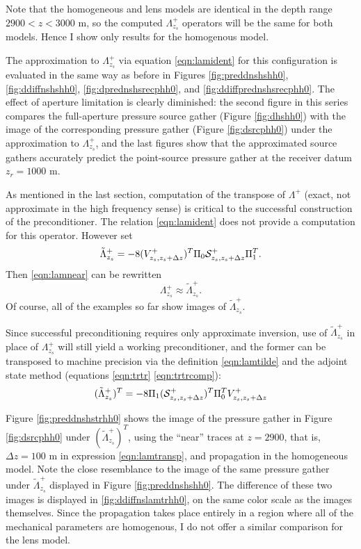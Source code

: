 Note that the homogeneous and lens models are identical in the depth
range $2900 < z < 3000$ m, so the computed $\Lambda^+_{z_s}$ operators
will be the same for both models. Hence I show only results for the
homogenous model.

The approximation to $\Lambda_{z_s}^+$ via equation \ref{eqn:lamident}
for this configuration is evaluated in the same way as before in
Figures \ref{fig:preddnshshh0}, \ref{fig:ddiffnshshh0},
\ref{fig:dprednshsrecphh0}, and \ref{fig:ddiffprednshsrecphh0}. The effect of aperture
limitation is clearly diminished: the second figure in this series
compares the full-aperture pressure source gather (Figure
\ref{fig:dhshh0}) with the 
image of the corresponding pressure gather (Figure \ref{fig:dsrcphh0})
under the approximation to $\Lambda_{z_s}^+$, and the last figures
show that the approximated source gathers accurately predict the
point-source pressure gather at the receiver datum $z_r=1000$ m.

As mentioned in the last section, computation of the transpose of
$\Lambda^+$ (exact, not approximate in the high frequency sense) is
critical to the successful construction of the preconditioner. The
relation \ref{eqn:lamident} does not provide a computation for this
operator. However set
\begin{equation}
  \label{eqn:lamtilde}
  \tilde{\Lambda}^+_{z_s} = -8(V^{+}_{z_s,z_s+\Delta z})^T\Pi_0 {\cal
    S}^+_{z_s,z_s+\Delta z}\Pi_1^T.
\end{equation}
Then \ref{eqn:lamnear} can be rewritten
\[
  \Lambda^+_{z_s} \approx \tilde{\Lambda}^+_{z_s}.
\]
Of course, all of the examples so far show images of
$\tilde{\Lambda}^+_{z_s}$.

Since successful preconditioning requires only approximate inversion,
use of $\tilde{\Lambda}^+_{z_s} $ in place of $\Lambda^+_{z_s}$ will
still yield a working preconditioner, and the former can be transposed
to machine precision via the definition \ref{eqn:lamtilde} and the adjoint state
method (equations \ref{eqn:trtr} \ref{eqn:trtrcomp}):
\begin{equation}
  \label{eqn:lamtransp}
  (\tilde{\Lambda}^+_{z_s})^T = -8 \Pi_1 ({\cal S}^+_{z_s,z_s+\Delta
    z})^T\Pi_0^T V^{+}_{z_s,z_s+\Delta z}
\end{equation}

Figure \ref{fig:preddnshstrhh0} shows the image of the pressure gather
in Figure \ref{fig:dsrcphh0} under $(\tilde{\Lambda}^+_{z_s})^T$,
using the ``near'' traces at $z=2900$, that is, $\Delta z = 100$ m in
expression \ref{eqn:lamtransp}, and propagation in the
homogeneous model. Note
the close resemblance to the image of the same pressure gather under
$\tilde{\Lambda}^+_{z_s}$ displayed in Figure
\ref{fig:preddnshshh0}. The difference of these two images is
displayed in \ref{fig:ddiffnslamtrhh0}, on the same color scale as the
images themselves. Since the propagation takes place entirely in a
region where all of the mechanical parameters are homogenous, I do not
offer a similar comparison for the lens model.

